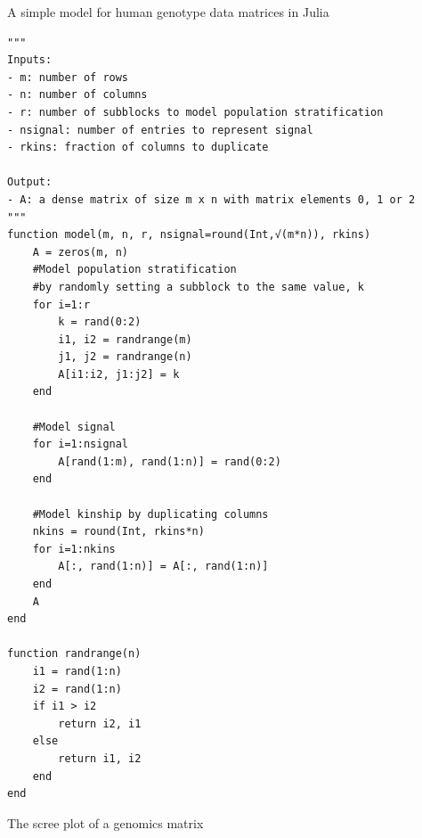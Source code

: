 \documentclass[final,leqno]{siamltex1213}
\begin{document}
\begin{algorithm}
\caption{A simple model for human genotype data matrices in Julia
\label{code:model}}
\begin{lstlisting}
"""
Inputs:
- m: number of rows
- n: number of columns
- r: number of subblocks to model population stratification
- nsignal: number of entries to represent signal
- rkins: fraction of columns to duplicate

Output:
- A: a dense matrix of size m x n with matrix elements 0, 1 or 2
"""
function model(m, n, r, nsignal=round(Int,√(m*n)), rkins)
    A = zeros(m, n)
    #Model population stratification
    #by randomly setting a subblock to the same value, k
    for i=1:r
        k = rand(0:2)
        i1, i2 = randrange(m)
        j1, j2 = randrange(n)
        A[i1:i2, j1:j2] = k
    end

    #Model signal
    for i=1:nsignal
        A[rand(1:m), rand(1:n)] = rand(0:2)
    end

    #Model kinship by duplicating columns
    nkins = round(Int, rkins*n)
    for i=1:nkins
        A[:, rand(1:n)] = A[:, rand(1:n)]
    end
    A
end

function randrange(n)
    i1 = rand(1:n)
    i2 = rand(1:n)
    if i1 > i2
        return i2, i1
    else
        return i1, i2
    end
end
\end{lstlisting}
\end{algorithm}

The scree plot of a genomics matrix
\end{document}
